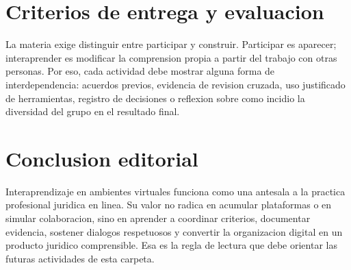 \documentclass[
  spanish,
  letterpaper, oneside
]{article}
\begin{document}
\section{Criterios de entrega y evaluacion}

La materia exige distinguir entre participar y construir. Participar es aparecer;
interaprender es modificar la comprension propia a partir del trabajo con otras
personas. Por eso, cada actividad debe mostrar alguna forma de interdependencia:
acuerdos previos, evidencia de revision cruzada, uso justificado de herramientas,
registro de decisiones o reflexion sobre como incidio la diversidad del grupo en
el resultado final.

\section{Conclusion editorial}

Interaprendizaje en ambientes virtuales funciona como una antesala a la practica
profesional juridica en linea. Su valor no radica en acumular plataformas o en
simular colaboracion, sino en aprender a coordinar criterios, documentar
evidencia, sostener dialogos respetuosos y convertir la organizacion digital en
un producto juridico comprensible. Esa es la regla de lectura que debe orientar
las futuras actividades de esta carpeta.

\clearpage
\nocite{unadmSitioWeb,unadmMallaDerecho2024,vygotsky1978mind,johnsonJohnson1999learning,unescoDigitalLiteracy2018,unescoInterculturalCompetences2013,unescoGenerativeAI2023,cpeum2026,leyDerechosLinguisticos2024}

\end{document}
